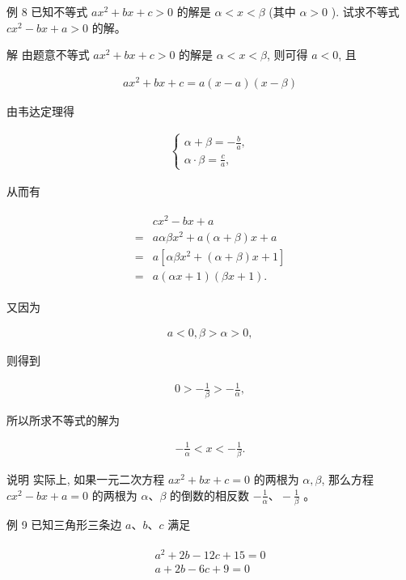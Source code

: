 \documentclass[10pt]{article}
\begin{document}
例 8 已知不等式 $a x^{2}+b x+c>0$ 的解是 $\alpha<x<\beta$ (其中 $\alpha>0$ ). 试求不等式 $c x^{2}-b x+a>0$ 的解。

解 由题意不等式 $a x^{2}+b x+c>0$ 的解是 $\alpha<x<\beta$, 则可得 $a<0$, 且

\begin{align*}
a x^{2}+b x+c=a(x-a)(x-\beta)
\end{align*}

由韦达定理得

\begin{align*}
\left\{\begin{array}{l}
\alpha+\beta=-\frac{b}{a}, \\
\alpha \cdot \beta=\frac{c}{a},
\end{array}\right.
\end{align*}

从而有

\begin{align*}
\begin{aligned}
& c x^{2}-b x+a \\
= & a \alpha \beta x^{2}+a(\alpha+\beta) x+a \\
= & a\left[\alpha \beta x^{2}+(\alpha+\beta) x+1\right] \\
= & a(\alpha x+1)(\beta x+1) .
\end{aligned}
\end{align*}

又因为

\begin{align*}
a<0, \beta>\alpha>0,
\end{align*}

则得到

\begin{align*}
0>-\frac{1}{\beta}>-\frac{1}{\alpha},
\end{align*}

所以所求不等式的解为

\begin{align*}
-\frac{1}{\alpha}<x<-\frac{1}{\beta} .
\end{align*}

说明 实际上, 如果一元二次方程 $a x^{2}+b x+c=0$ 的两根为 $\alpha, \beta$, 那么方程 $c x^{2}-b x+a=0$ 的两根为 $\alpha 、 \beta$ 的倒数的相反数 $-\frac{1}{\alpha} 、-\frac{1}{\beta}$ 。

例 9 已知三角形三条边 $a 、 b 、 c$ 满足

\begin{align*}
\begin{gathered}
a^{2}+2 b-12 c+15=0 \\
a+2 b-6 c+9=0
\end{gathered}
\end{align*}
\end{document}
